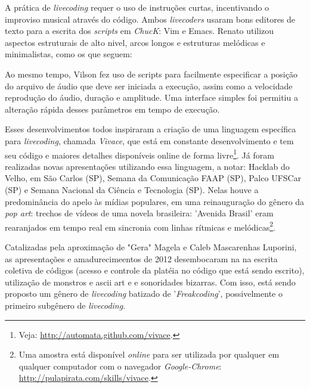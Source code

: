A prática de \emph{livecoding} requer o uso de 
instruções curtas, incentivando o improviso
musical através do código. Ambos \emph{livecoders}
usaram bons editores de texto
para a escrita dos \emph{scripts} em \emph{ChucK}: Vim e Emacs.
Renato utilizou aspectos estruturais de alto nivel, 
arcos longos e estruturas
melódicas e minimalistas, como os que seguem:


Ao mesmo tempo, Vilson fez uso de scripts para
facilmente especificar a posição do arquivo de
áudio que deve ser iniciada a execução, assim como a velocidade
reprodução do áudio, duração e
amplitude. Uma interface simples foi permitiu a
alteração rápida desses parâmetros em tempo de execução.



Esses desenvolvimentos todos inspiraram a criação de uma linguagem
específica para \emph{livecoding}, chamada \emph{Vivace}, que está em constante
desenvolvimento e tem seu código e maiores detalhes disponíveis online
de forma livre\footnote{Veja: 
\url{http://automata.github.com/vivace}.}. Já foram realizadas novas
apresentações utilizando essa linguagem, a notar: Hacklab do Velho, em
São Carlos (SP), Semana da Comunicação FAAP (SP), Palco UFSCar (SP) e
Semana Nacional da Ciência e Tecnologia (SP). Nelas houve a
predominância do apelo às mídias populares, em uma reinauguração do
gênero da \emph{pop art}: trechos de vídeos de uma novela brasileira: 'Avenida Brasil'
eram rearanjados em tempo real em sincronia com linhas rítmicas e
melódicas\footnote{Uma
  amostra está disponível \emph{online} para ser utilizada por qualquer
  em qualquer computador com o navegador \emph{Google-Chrome}:
  \url{http://pulapirata.com/skills/vivace}.}.

  Catalizadas pela aproximação de "Gera" Magela e Caleb Mascarenhas Luporini, as
   apresentações e amadurecimeentos de 2012 desembocaram na
  na escrita coletiva de códigos (acesso e controle da platéia 
  no código que está sendo escrito), utilização de monstros e ascii art e
  e sonoridades bizarras. Com isso, está sendo proposto
  um gênero de \emph{livecoding} batizado de '\emph{Freakcoding}', possivelmente o primeiro subgênero
  de \emph{livecoding}.

